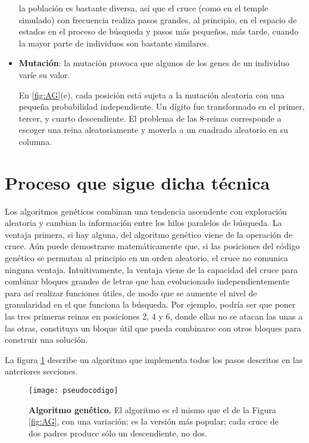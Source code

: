 \begin{itemize}
		la población es bastante diversa, así que el cruce (como en el temple simulado) con frecuencia realiza pasos grandes, al principio, 
		en el espacio de estados en el proceso de búsqueda y pasos más pequeños, más tarde, cuando la mayor parte de individuos son bastante
		 similares.
		\item \textbf{Mutación}: la mutación provoca que algunos de los genes de un individuo varíe su valor.
		\par En \ref{fig:AG}(e), cada posición está sujeta a la mutación aleatoria con una pequeña probabilidad independiente. 
		Un dígito fue transformado en el primer, tercer, y cuarto descendiente. El problema de las 8-reinas corresponde a 
		escoger una reina aleatoriamente y moverla a un cuadrado aleatorio en su columna.
	\end{itemize}

\section{Proceso que sigue dicha técnica}
	
	\par Los algoritmos genéticos combinan una tendencia ascendente con exploración 
	aleatoria y cambian la información entre los hilos paralelos de búsqueda. La ventaja primera, si hay alguna, del algoritmo 
	genético viene de la operación de cruce. Aún puede demostrarse matemáticamente que, si las posiciones del código genético 
	se permutan al principio en un orden aleatorio, el cruce no comunica ninguna ventaja. Intuitivamente, la ventaja viene 
	de la capacidad del cruce para combinar bloques grandes de letras que han evolucionado independientemente para así realizar 
	funciones útiles, de modo que se aumente el nivel de granularidad en el que funciona la búsqueda. Por ejemplo, podría ser 
	que poner las tres primeras reinas en posiciones 2, 4 y 6, donde ellas no se atacan las unas a las otras, constituya un bloque 
	útil que pueda combinarse con otros bloques para construir una solución.

	\par La figura \ref{fig:pseudocodigo} describe un algoritmo que implementa todos los pasos descritos en las anteriores secciones.
	 \begin{figure}[H]
		\texttt{[image: pseudocodigo]}
		\centering
		\caption{\textbf{Algoritmo genético.} El algoritmo es el mismo que el de la Figura \ref{fig:AG}, 
		con una variación: es la versión más popular; cada cruce de dos padres produce sólo un descendiente, no dos.}
			\label{fig:pseudocodigo}
	\end{figure}
\newpage
{}